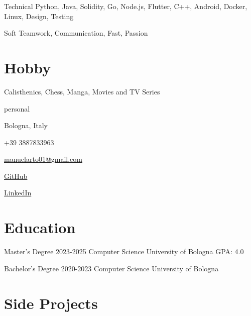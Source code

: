 \documentclass{tccv}
\begin{document}
\begin{factlist}

\item{Technical}
     {Python, Java, Solidity, Go, Node.js, Flutter, C++, Android, Docker, Linux, Design, Testing} \\

\item{Soft}
     {Teamwork, Communication, Fast, Passion}

\end{factlist}


\section{Hobby}

Calisthenics, Chess, Manga, Movies and TV Series


\newpage


\begin{keyvaluelist}{personal}
    \item[\faHome] Bologna, Italy
    \item[\faPhone] +39 3887833963
    \item[\faEnvelope] \href{mailto:manuelarto01@gmail.com}{manuelarto01@gmail.com}
    \item[\faGithub] \href{https://github.com/manuelarto}{GitHub}
    \item[\faLinkedin] \href{https://www.linkedin.com/in/manuel-arto-696012203/}{LinkedIn}
\end{keyvaluelist}


\section{Education}

\begin{yearlist}

\item[Master's Degree]{2023-2025}
     {Computer Science}
     {University of Bologna \newline GPA: 4.0}

\item[Bachelor's Degree]{2020-2023}
    {Computer Science}
    {University of Bologna}

\end{yearlist}


\section{Side Projects}
\end{document}
